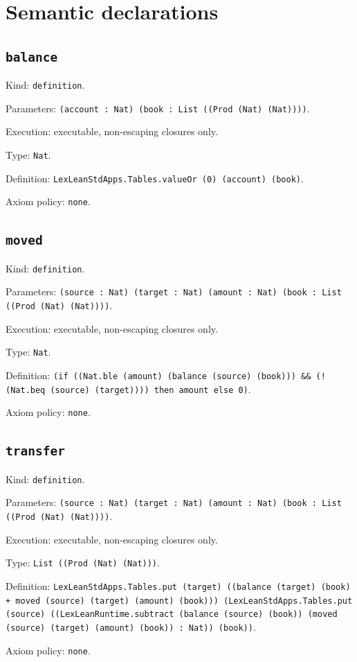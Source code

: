 \documentclass[11pt]{article}
\begin{document}
\section*{Semantic declarations}
\subsection*{\texttt{balance}}
\noindent Kind: \texttt{definition}.\par
\noindent Parameters: \texttt{(account : Nat) (book : List ((Prod (Nat) (Nat))))}.\par
\noindent Execution: executable, non-escaping closures only.\par
\noindent Type: \texttt{Nat}.\par
\noindent Definition: \texttt{LexLeanStdApps.Tables.valueOr (0) (account) (book)}.\par
\noindent Axiom policy: \texttt{none}.\par
\subsection*{\texttt{moved}}
\noindent Kind: \texttt{definition}.\par
\noindent Parameters: \texttt{(source : Nat) (target : Nat) (amount : Nat) (book : List ((Prod (Nat) (Nat))))}.\par
\noindent Execution: executable, non-escaping closures only.\par
\noindent Type: \texttt{Nat}.\par
\noindent Definition: \texttt{(if ((Nat.ble (amount) (balance (source) (book))) \&\& (!(Nat.beq (source) (target)))) then amount else 0)}.\par
\noindent Axiom policy: \texttt{none}.\par
\subsection*{\texttt{transfer}}
\noindent Kind: \texttt{definition}.\par
\noindent Parameters: \texttt{(source : Nat) (target : Nat) (amount : Nat) (book : List ((Prod (Nat) (Nat))))}.\par
\noindent Execution: executable, non-escaping closures only.\par
\noindent Type: \texttt{List ((Prod (Nat) (Nat)))}.\par
\noindent Definition: \texttt{LexLeanStdApps.Tables.put (target) ((balance (target) (book) + moved (source) (target) (amount) (book))) (LexLeanStdApps.Tables.put (source) ((LexLeanRuntime.subtract (balance (source) (book)) (moved (source) (target) (amount) (book)) : Nat)) (book))}.\par
\noindent Axiom policy: \texttt{none}.\par
\end{document}
